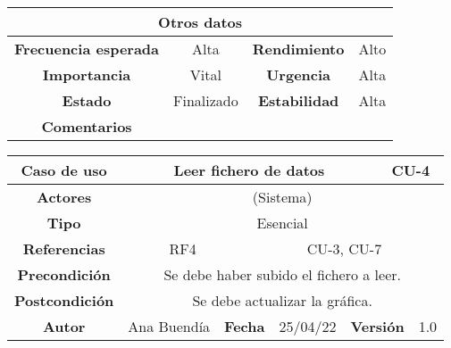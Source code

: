 \begin{table}[!h]
\begin{tabular}{|c|c|c|c|}
\hline
\multicolumn{4}{|c|}{\cellcolor{cyan} \textbf{Otros datos}} \\
\hline
 \cellcolor{cyan} \textbf{Frecuencia esperada}             &     Alta          &    \cellcolor{cyan} \textbf{Rendimiento}          &      Alto        \\
\hline
 \cellcolor{cyan} \textbf{Importancia}             &      Vital         &     \cellcolor{cyan} \textbf{Urgencia}         &      Alta        \\
\hline
 \cellcolor{cyan} \textbf{Estado}             &      Finalizado         &    \cellcolor{cyan} \textbf{Estabilidad}          &     Alta         \\
\hline
 \cellcolor{cyan} \textbf{Comentarios}        &  \multicolumn{3}{|c|}{} \\
\hline
\end{tabular}
\end{table}




\clearpage

\begin{table}[!h]
\begin{tabular}{|c|c|c|c|c|c|c|c|}
\hline
\rowcolor{cyan} \textbf{Caso de uso} & \multicolumn{5}{|c|}{Leer fichero de datos} & \multicolumn{2}{|c|}{CU-4} \\
\hline
\cellcolor{cyan} \textbf{Actores}              & \multicolumn{7}{|c|}{(Sistema)}           \\
\hline
\cellcolor{cyan} \textbf{Tipo}                 & \multicolumn{7}{|c|}{Esencial}             \\
\hline
\cellcolor{cyan} \textbf{Referencias}          & \multicolumn{2}{|c|}{RF4}           & \multicolumn{5}{|c|}{CU-3, CU-7}\\
\hline
\cellcolor{cyan} \textbf{Precondición}         & \multicolumn{7}{|c|}{Se debe haber subido el fichero a leer.}             \\
\hline
\cellcolor{cyan} \textbf{Postcondición}        & \multicolumn{7}{|c|}{Se debe actualizar la gráfica.}              \\
\hline
\cellcolor{cyan} \textbf{Autor}                &   Ana Buendía   & \multicolumn{2}{|c|}{\cellcolor{cyan} \textbf{Fecha}} &  25/04/22   & \multicolumn{2}{|c|}{\cellcolor{cyan} \textbf{Versión}} & 1.0  \\
\hline
\end{tabular}
\end{table}

